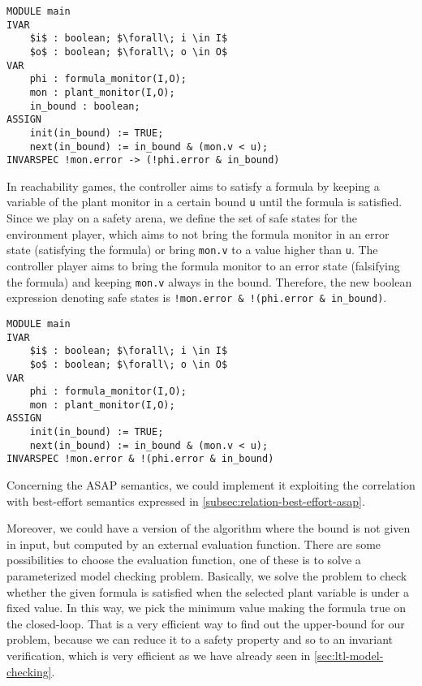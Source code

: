 \begin{lstlisting}[language=smv,mathescape=true, caption=Reduction to synthesis problem: safe states for safety properties with bound]
MODULE main
IVAR
    $i$ : boolean; $\forall\; i \in I$
    $o$ : boolean; $\forall\; o \in O$
VAR
    phi : formula_monitor(I,O);
    mon : plant_monitor(I,O);
    in_bound : boolean;
ASSIGN
    init(in_bound) := TRUE;
    next(in_bound) := in_bound & (mon.v < u);
INVARSPEC !mon.error -> (!phi.error & in_bound)
\end{lstlisting}

In reachability games, the controller aims to satisfy a formula by keeping a variable of the plant monitor in a certain bound \lstinline{u} until the formula is satisfied.
Since we play on a safety arena, we define the set of safe states for the environment player, which aims to not bring the formula monitor in an error state (satisfying the formula) or bring \lstinline{mon.v} to a value higher than \lstinline{u}.
The controller player aims to bring the formula monitor to an error state (falsifying the formula) and keeping \lstinline{mon.v} always in the bound.
Therefore, the new boolean expression denoting safe states is \lstinline{!mon.error & !(phi.error & in_bound)}.

\begin{lstlisting}[language=smv,mathescape=true,  caption=Reduction to synthesis problem: safe states for co-safety properties with bound, label={lst:in-bound-co-safety}]
MODULE main
IVAR
    $i$ : boolean; $\forall\; i \in I$
    $o$ : boolean; $\forall\; o \in O$
VAR
    phi : formula_monitor(I,O);
    mon : plant_monitor(I,O);
ASSIGN
    init(in_bound) := TRUE;
    next(in_bound) := in_bound & (mon.v < u);
INVARSPEC !mon.error & !(phi.error & in_bound)
\end{lstlisting}


Concerning the ASAP semantics, we could implement it exploiting the correlation with best-effort semantics expressed in \autoref{subsec:relation-best-effort-asap}. 

Moreover, we could have a version of the algorithm where the bound is not given in input, but computed by an external evaluation function.
There are some possibilities to choose the evaluation function, one of these is to solve a parameterized model checking problem.
Basically, we solve the problem to check whether the given formula is satisfied when the selected plant variable is under a fixed value. 
In this way, we pick the minimum value making the formula true on the closed-loop. 
That is a very efficient way to find out the upper-bound for our problem, because we can reduce it to a safety property and so to an invariant verification, which is very efficient as we have already seen in \autoref{sec:ltl-model-checking}. 

